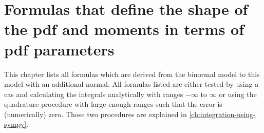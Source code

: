 \chapter{Formulas that define the shape of the pdf and moments in terms of pdf parameters}
\label{ch:formulas-that-define-the-shape-of-the-pdf-and-moments-in-terms-of-pdf-parameters}

This chapter lists all formulas which are derived from the binormal model to this model with an additional normal.
All formulas listed are either tested by using a \gls{cas}
and calculating the integrals analytically with ranges $-\infty$ to $\infty$ or
using the quadrature procedure with large enough ranges such that the error is (numerically) zero.
Those two procedures are explained in \cref{ch:integration-using-sympy}.













